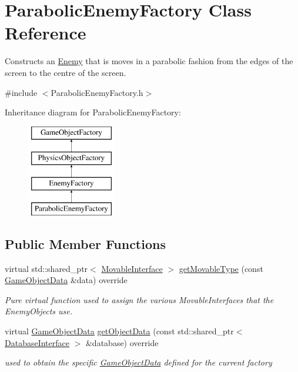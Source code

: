 \hypertarget{class_parabolic_enemy_factory}{}\section{Parabolic\+Enemy\+Factory Class Reference}
\label{class_parabolic_enemy_factory}


Constructs an \hyperlink{class_enemy}{Enemy} that is moves in a parabolic fashion from the edges of the screen to the centre of the screen.  




{\ttfamily \#include $<$Parabolic\+Enemy\+Factory.\+h$>$}

Inheritance diagram for Parabolic\+Enemy\+Factory\+:\begin{figure}[H]
\begin{center}
\leavevmode
\includegraphics[height=4.000000cm]{db/d73/class_parabolic_enemy_factory}
\end{center}
\end{figure}
\subsection*{Public Member Functions}
\begin{DoxyCompactItemize}
\item 
virtual std\+::shared\+\_\+ptr$<$ \hyperlink{class_movable_interface}{Movable\+Interface} $>$ \hyperlink{class_parabolic_enemy_factory_aaf1f3323e4c723f669a11c20a7e38efe}{get\+Movable\+Type} (const \hyperlink{struct_game_object_data}{Game\+Object\+Data} \&data) override
\begin{DoxyCompactList}\small\item\em Pure virtual function used to assign the various Movable\+Interfaces that the Enemy\+Objects use. \end{DoxyCompactList}\item 
virtual \hyperlink{struct_game_object_data}{Game\+Object\+Data} \hyperlink{class_parabolic_enemy_factory_acc62c48a8eb5af162910dc48d9fe8900}{get\+Object\+Data} (const std\+::shared\+\_\+ptr$<$ \hyperlink{class_database_interface}{Database\+Interface} $>$ \&database) override
\begin{DoxyCompactList}\small\item\em used to obtain the specific \hyperlink{struct_game_object_data}{Game\+Object\+Data} defined for the current factory \end{DoxyCompactList}\end{DoxyCompactItemize}
